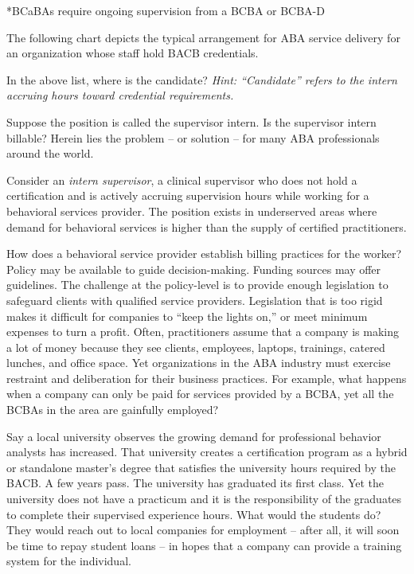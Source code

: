 *BCaBAs require ongoing supervision from a BCBA or BCBA-D

The following chart depicts the typical arrangement for ABA service delivery for an organization whose staff hold BACB\textregistered{} credentials.


In the above list, where is the candidate? \textit{Hint: ``Candidate'' refers to the intern accruing hours toward credential requirements.}

Suppose the position is called the supervisor intern. Is the supervisor intern billable? Herein lies the problem – or solution – for many ABA professionals around the world.

Consider an \textit{intern supervisor}, a clinical supervisor who does not hold a certification and is actively accruing supervision hours while working for a behavioral services provider. The position exists in underserved areas where demand for behavioral services is higher than the supply of certified practitioners. 

How does a behavioral service provider establish billing practices for the worker? Policy may be available to guide decision-making. Funding sources may offer guidelines. The challenge at the policy-level is to provide enough legislation to safeguard clients with qualified service providers. Legislation that is too rigid makes it difficult for companies to ``keep the lights on,'' or meet minimum expenses to turn a profit. Often, practitioners assume that a company is making a lot of money because they see clients, employees, laptops, trainings, catered lunches, and office space. Yet organizations in the ABA industry must exercise restraint and deliberation for their business practices. For example, what happens when a company can only be paid for services provided by a BCBA, yet all the BCBAs in the area are gainfully employed? 

Say a local university observes the growing demand for professional behavior analysts has increased. That university creates a certification program as a hybrid or standalone master's degree that satisfies the university hours required by the BACB. A few years pass. The university has graduated its first class. Yet the university does not have a practicum and it is the responsibility of the graduates to complete their supervised experience hours. What would the students do? They would reach out to local companies for employment – after all, it will soon be time to repay student loans – in hopes that a company can provide a training system for the individual.

